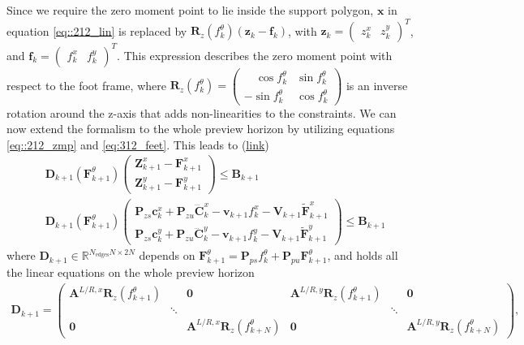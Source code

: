 Since we require the zero moment point to lie inside the support polygon, $\bm{x}$ in equation \ref{eq::212_lin} is replaced by $\bm{R}_z(f_k^\theta)(\bm{z}_k-\bm{f}_k)$, with $\bm{z}_k=\begin{pmatrix}
z_k^x & z_k^y
\end{pmatrix}^T$, and $\bm{f}_k=\begin{pmatrix}
f_k^x & f_k^y
\end{pmatrix}^T$. This expression describes the zero moment point with respect to the foot frame, where $\bm{R}_z(f_k^\theta) = \begin{pmatrix}
\quad\cos f_k^\theta & \sin f_k^\theta \\
-\sin f_k^\theta& \cos f_k^\theta
\end{pmatrix}$ is an inverse rotation around the z-axis that adds non-linearities to the constraints. We can now extend the formalism to the whole preview horizon by utilizing equations \ref{eq::212_zmp} and \ref{eq:312_feet}. This leads to (\href{https://github.com/mhubii/nmpc_pattern_generator/blob/5a213044c927dc6aac9f7e32ce1e5fb472cd67bb/libs/pattern_generator/src/base_generator.cpp#L946}{\underline{link}})
\begin{align}
	&\bm{D}_{k+1}(\bm{F}_{k+1}^{\theta})\begin{pmatrix}
		\bm{Z}_{k+1}^x - \bm{F}_{k+1}^x \\
		\bm{Z}_{k+1}^y - \bm{F}_{k+1}^y
	\end{pmatrix} \leq \bm{B}_{k+1} \\
	&\bm{D}_{k+1}(\bm{F}_{k+1}^{\theta})\begin{pmatrix}
		\bm{P}_{zs} \bm{c}_k^x + \bm{P}_{zu}\dddot{\bm{C}}_k^x - \bm{v}_{k+1}f_k^x-\bm{V}_{k+1}\tilde{\bm{F}}_{k+1}^x \\
		\bm{P}_{zs} \bm{c}_k^y + \bm{P}_{zu}\dddot{\bm{C}}_k^y - \bm{v}_{k+1}f_k^y-\bm{V}_{k+1}\tilde{\bm{F}}_{k+1}^y
	\end{pmatrix} \leq \bm{B}_{k+1}
	\label{eq::212_cop_hull}
\end{align}
where $\bm{D}_{k+1}\in\mathbb{R}^{N_\text{edges}N\times2N}$ depends on $\bm{F}_{k+1}^{\theta} = \bm{P}_{ps}f_k^\theta + \bm{P}_{pu}\bm{F}_{k+1}^\theta$, and holds all the linear equations on the whole preview horizon \begin{align}
\bm{D}_{k+1} = \begin{pmatrix}
	\bm{A}^{L/R,x}\bm{R}_z(f_{k+1}^\theta)&                  &\bm{0}                 &\bm{A}^{L/R,y}\bm{R}_z(f_{k+1}^\theta)&      &\bm{0} \\
	                  &\ddots            &                  &                  &\ddots& \\
	\bm{0}                 &                  &\bm{A}^{L/R,x}\bm{R}_z(f_{k+N}^\theta)&\bm{0}                 &      &\bm{A}^{L/R,y}\bm{R}_z(f_{k+N}^\theta)
\end{pmatrix},
\label{eq::212_rot1}
\end{align}
